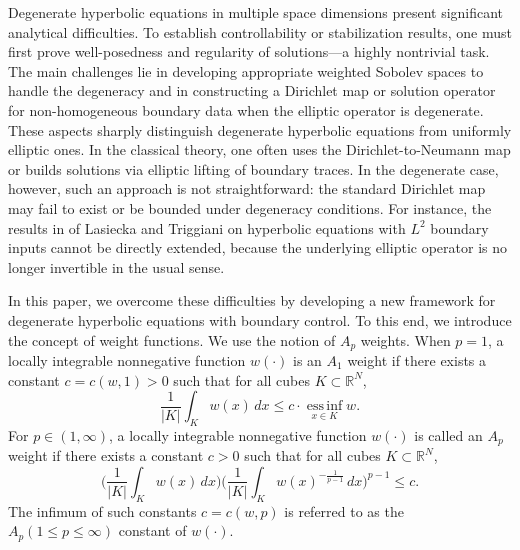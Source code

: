 \documentclass[preprint,12pt]{elsarticle}
\theoremstyle{definition}   %
\numberwithin{equation}{section}
\begin{document}
Degenerate hyperbolic equations in multiple space dimensions present significant analytical difficulties. To establish controllability or stabilization results, one must first prove well-posedness and regularity of solutions---a highly nontrivial task. The main challenges lie in developing appropriate weighted Sobolev spaces to handle the degeneracy and in constructing a Dirichlet map or solution operator for non-homogeneous boundary data when the elliptic operator is degenerate. These aspects sharply distinguish degenerate hyperbolic equations from uniformly elliptic ones. In the classical theory, one often uses the Dirichlet-to-Neumann map or builds solutions via elliptic lifting of boundary traces. In the degenerate case, however, such an approach is not straightforward: the standard Dirichlet map may fail to exist or be bounded under degeneracy conditions. For instance, the results in \cite{Lasiecka1,Lasiecka2} of Lasiecka and Triggiani on hyperbolic equations with $L^2$ boundary inputs cannot be directly extended, because the underlying elliptic operator is no longer invertible in the usual sense.

In this paper, we overcome these difficulties by developing a new framework for degenerate hyperbolic equations with boundary control. To this end, we introduce the concept of weight functions. We use the notion of $A_p$ weights. When $p=1$, a locally integrable nonnegative function $w(\cdot)$ is an $A_1$ weight if there exists a constant $c=c(w,1)>0$ such that for all cubes $K\subset\mathbb{R}^N$,
\[
\frac{1}{|K|}\int_K w(x)\, dx \le c \cdot \operatorname*{ess\,inf}_{x\in K} w.
\]
For $p\in(1,\infty)$, a locally integrable nonnegative function $w(\cdot)$ is called an $A_p$ weight if there exists a constant $c>0$ such that for all cubes $K\subset\mathbb{R}^N$,
\begin{equation}
\Bigg(\frac{1}{|K|}\int_K w(x)\, dx\Bigg)
\Bigg(\frac{1}{|K|}\int_K w(x)^{-\frac{1}{p-1}}\, dx\Bigg)^{p-1}
\le c.
\label{01.18.2}
\end{equation}
The infimum of such constants $c=c(w,p)$ is referred to as the $A_p (1\le p \le \infty)$ constant of $w(\cdot)$.
\end{document}
